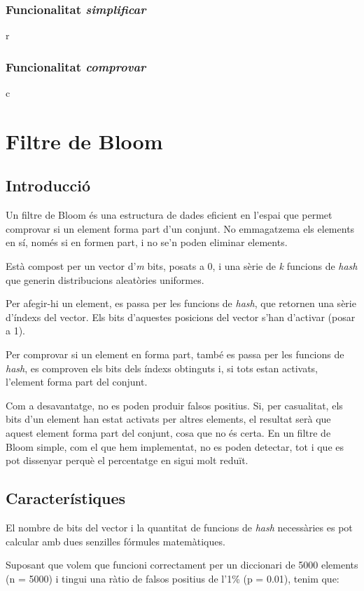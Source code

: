 \documentclass[titlepage]{article}
\begin{document}
\subsubsection{Funcionalitat \textit{simplificar}}
r
\subsubsection{Funcionalitat \textit{comprovar}}
c

\clearpage
\section{Filtre de Bloom}
\subsection{Introducció}
Un filtre de Bloom és una estructura de dades eficient en l'espai que permet comprovar si un element forma part d'un conjunt. No emmagatzema els elements en sí, només si en formen part, i no se'n poden eliminar elements.

Està compost per un vector d'\textit{m} bits, posats a 0, i una sèrie de \textit{k} funcions de \textit{hash} que generin distribucions aleatòries uniformes.

Per afegir-hi un element, es passa per les funcions de \textit{hash}, que retornen una sèrie d'índexs del vector. Els bits d'aquestes posicions del vector s'han d'activar (posar a 1).

Per comprovar si un element en forma part, també es passa per les funcions de \textit{hash}, es comproven els bits dels índexs obtinguts i, si tots estan activats, l'element forma part del conjunt.

Com a desavantatge, no es poden produir falsos positius. Si, per casualitat, els bits d'un element han estat activats per altres elements, el resultat serà que aquest element forma part del conjunt, cosa que no és certa. En un filtre de Bloom simple, com el que hem implementat, no es poden detectar, tot i que es pot dissenyar perquè el percentatge en sigui molt reduït. 

\subsection{Característiques}
El nombre de bits del vector i la quantitat de funcions de \textit{hash} necessàries es pot calcular amb dues senzilles fórmules matemàtiques.

Suposant que volem que funcioni correctament per un diccionari de 5000 elements (n = 5000) i tingui una ràtio de falsos positius de l'1\% (p = 0.01), tenim que:
\end{document}
